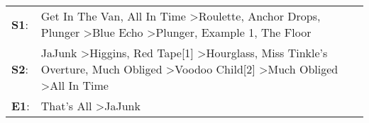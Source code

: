 \begin{supertabular}{p{0.03\textwidth}p{0.92\textwidth}}
 \textbf{S1}:  &                                             Get In The Van\textsuperscript{}, \enspace All In Time\textsuperscript{} \textgreater \enspace Roulette\textsuperscript{}, \enspace Anchor Drops\textsuperscript{}, \enspace Plunger\textsuperscript{} \textgreater \enspace Blue Echo\textsuperscript{} \textgreater \enspace Plunger\textsuperscript{}, \enspace Example 1\textsuperscript{}, \enspace The Floor\textsuperscript{}  \enspace  \\
 \textbf{S2}:  &  JaJunk\textsuperscript{} \textgreater \enspace Higgins\textsuperscript{}, \enspace Red Tape[1]\textsuperscript{} \textgreater \enspace Hourglass\textsuperscript{}, \enspace Miss Tinkle's Overture\textsuperscript{}, \enspace Much Obliged\textsuperscript{} \textgreater \enspace Voodoo Child[2]\textsuperscript{} \textgreater \enspace Much Obliged\textsuperscript{} \textgreater \enspace All In Time\textsuperscript{}  \enspace  \\
 \textbf{E1}:  &                                                                                                                                                                                                                                                                                                                                                      That's All\textsuperscript{} \textgreater \enspace JaJunk\textsuperscript{}  \enspace  \\
\end{supertabular}

